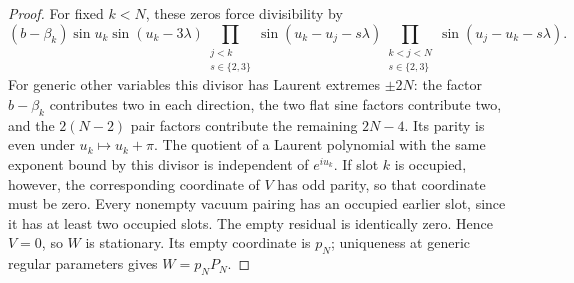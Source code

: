 \begin{proof}
For fixed $k<N$, these zeros force divisibility by
\[
 (b-\beta_k)\sin u_k\sin(u_k-3\lambda)
 \prod_{\substack{j<k\\s\in\{2,3\}}}
       \sin(u_k-u_j-s\lambda)
 \prod_{\substack{k<j<N\\s\in\{2,3\}}}
       \sin(u_j-u_k-s\lambda).
\]
For generic other variables this divisor has Laurent extremes
$\pm2N$: the factor $b-\beta_k$ contributes two in each direction,
the two flat sine factors contribute two, and the $2(N-2)$ pair factors
contribute the remaining $2N-4$. Its parity is even under $u_k\mapsto u_k+\pi$.
The quotient of a Laurent polynomial with the same exponent bound
by this divisor is independent of $e^{iu_k}$. If slot $k$ is
occupied, however, the corresponding coordinate of $V$ has odd
parity, so that coordinate must be zero. Every nonempty vacuum
pairing has an occupied earlier slot, since it has at least two
occupied slots. The empty residual is identically zero. Hence
$V=0$, so $W$ is stationary. Its empty coordinate is $p_N$;
uniqueness at generic regular parameters gives $W=p_NP_N$.
\end{proof}
